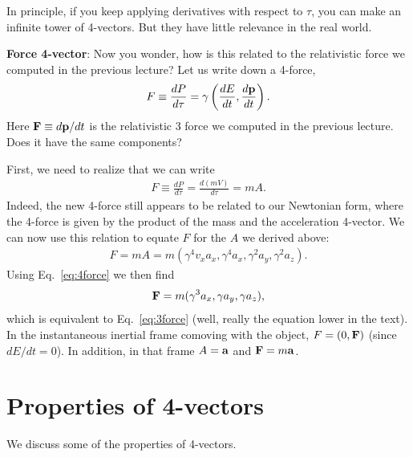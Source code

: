 \documentclass[12pt]{article}
\newcommand{\be}{\begin{eqnarray}}
\newcommand{\ee}{\end{eqnarray}}
\begin{document}
In principle, if you keep applying derivatives with respect to $\tau$, you can make an infinite tower of 4-vectors. But they have little relevance in the real world. 

\vspace{2em}

\noindent 
{\bf Force 4-vector}: Now you wonder, how is this related to the relativistic force we computed in the previous lecture? Let us write down a 4-force, 
\be
F \equiv \frac{dP}{d\tau} = \gamma\left(\frac{dE}{dt}, \frac{d{\bf p}}{dt}\right). \label{eq:4force}
\ee
Here ${\bf F} \equiv d{\bf p}/dt$ is the relativistic 3 force we computed in the previous lecture. Does it have the same components? 

First, we need to realize that we can write 
\be
F\equiv \frac{dP}{d\tau} = \frac{d (mV)}{d\tau} = m A.
\ee
Indeed, the new 4-force still appears to be related to our Newtonian form, where the 4-force is given by the product of the mass and the acceleration 4-vector. We can now use this relation to equate $F$ for the $A$ we derived above:
\be
F = mA = m(\gamma^4 v_x a_x, \gamma^4 a_x, \gamma^2 a_y, \gamma^2 a_z).
\ee
Using Eq.~\eqref{eq:4force} we then find
\be
{\bf F} = m(\gamma^3 a_x, \gamma a_y, \gamma a_z),
\ee
which is equivalent to Eq.~\eqref{eq:3force} (well, really the equation lower in the text). In the instantaneous inertial frame comoving with the object, $F = (0,{\bf F})$ (since $dE/dt = 0$). In addition, in that frame $A = {\bf a}$ and ${\bf F} = m{\bf a}$. 

\section{Properties of 4-vectors}\label{sec:properties}

We discuss some of the properties of 4-vectors. 
\end{document}
